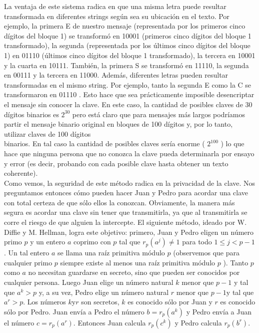 \documentclass[10pt]{article}
\begin{document}
La ventaja de este sistema radica en que una misma letra puede resultar transformada en diferentes strings según sea su ubicación en el texto. Por ejemplo, la primera E de nuestro mensaje (representada por los primeros cinco dígitos del bloque 1) se transformó en 10001 (primeros cinco dígitos del bloque 1 transformado), la segunda (representada por los últimos cinco dígitos del bloque 1) en 01110 (últimos cinco dígitos del bloque 1 transformado), la tercera en 10001 y la cuarta en 10111. También, la primera S se transformó en 11110, la segunda en 00111 y la tercera en 11000. Además, diferentes letras pueden resultar transformadas en el mismo string. Por ejemplo, tanto la segunda E como la C se transformaron en 01110 . Esto hace que sea prácticamente imposible desencriptar el mensaje sin conocer la clave. En este caso, la cantidad de posibles claves de 30 dígitos binarios es $2^{30}$ pero está claro que para mensajes más largos podríamos partir el mensaje binario original en bloques de 100 dígitos y, por lo tanto, utilizar claves de 100 dígitos\\
binarios. En tal caso la cantidad de posibles claves sería enorme ( $2^{100}$ ) lo que hace que ninguna persona que no conozca la clave pueda determinarla por ensayo y error (es decir, probando con cada posible clave hasta obtener un texto coherente).\\
Como vemos, la seguridad de este método radica en la privacidad de la clave. Nos preguntamos entonces cómo pueden hacer Juan y Pedro para acordar una clave con total certeza de que sólo ellos la conozcan. Obviamente, la manera más segura es acordar una clave sin tener que transmitirla, ya que al transmitirla se corre el riesgo de que alguien la intercepte. El siguiente método, ideado por W. Diffie y M. Hellman, logra este objetivo: primero, Juan y Pedro eligen un número primo $p$ y un entero $a$ coprimo con $p$ tal que $r_{p}\left(a^{j}\right) \neq 1$ para todo $1 \leq j<p-1$. Un tal entero $a$ se llama una raíz primitiva módulo $p$ (observemos que para cualquier primo $p$ siempre existe al menos una raíz primitiva módulo $p$ ). Tanto $p$ como $a$ no necesitan guardarse en secreto, sino que pueden ser conocidos por cualquier persona. Luego Juan elige un número natural $k$ menor que $p-1$ y tal que $a^{k}>p$ y, a su vez, Pedro elige un número natural $r$ menor que $p-1 \mathrm{y}$ tal que $a^{r}>p$. Los números $k \mathrm{y} r$ son secretos, $k$ es conocido sólo por Juan y $r$ es conocido sólo por Pedro. Juan envía a Pedro el número $b=r_{p}\left(a^{k}\right)$ y Pedro envía a Juan el número $c=r_{p}\left(a^{r}\right)$. Entonces Juan calcula $r_{p}\left(c^{k}\right)$ y Pedro calcula $r_{p}\left(b^{r}\right)$.\\
\end{document}
